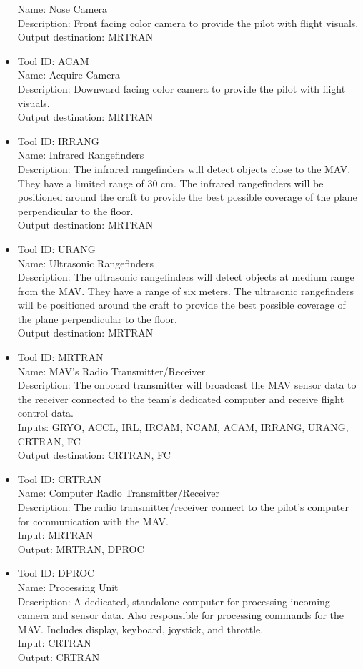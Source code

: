 \documentclass[onecolumn, draftclsnofoot, 10pt, compsoc]{IEEEtran}
\begin{document}
\begin{itemize}
Name: Nose Camera\\
Description: Front facing color camera to provide the pilot with flight visuals.\\
Output destination: MRTRAN
\item Tool ID: ACAM\\
Name: Acquire Camera\\
Description: Downward facing color camera to provide the pilot with flight visuals.\\
Output destination: MRTRAN
\item Tool ID: IRRANG\\
Name: Infrared Rangefinders\\
Description: The infrared rangefinders will detect objects close to the MAV. They have a limited range of 30 cm. The infrared rangefinders will be positioned around the craft to provide the best possible coverage of the plane perpendicular to the floor.\\
Output destination: MRTRAN
\item Tool ID: URANG\\
Name: Ultrasonic Rangefinders\\
Description: The ultrasonic rangefinders will detect objects at medium range from the MAV. They have a range of six meters. The ultrasonic rangefinders will be positioned around the craft to provide the best possible coverage of the plane perpendicular to the floor.\\
Output destination: MRTRAN
\item Tool ID: MRTRAN\\
Name: MAV’s Radio Transmitter/Receiver\\
Description: The onboard transmitter will broadcast the MAV sensor data to the receiver connected to the team’s dedicated computer and receive flight control data.\\
Inputs: GRYO, ACCL, IRL, IRCAM, NCAM, ACAM, IRRANG, URANG, CRTRAN, FC\\
Output destination: CRTRAN, FC
\item Tool ID: CRTRAN\\
Name: Computer Radio Transmitter/Receiver\\
Description: The radio transmitter/receiver connect to the pilot’s computer for communication with the MAV.\\
Input: MRTRAN\\
Output: MRTRAN, DPROC
\item Tool ID: DPROC\\
Name: Processing Unit\\
Description: A dedicated, standalone computer for processing incoming camera and sensor data. Also responsible for processing commands for the MAV. Includes display, keyboard, joystick, and throttle.\\
Input: CRTRAN\\
Output: CRTRAN
\end{itemize}
\end{document}
